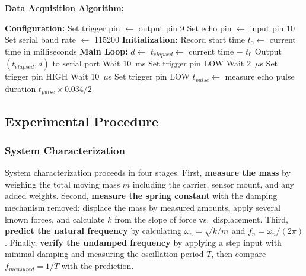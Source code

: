 \textbf{Data Acquisition Algorithm:}

\begin{algorithm}[H]
\caption{Second-Order System Distance Measurement}
\begin{algorithmic}[1]
\State \textbf{Configuration:}
\State \quad Set trigger pin $\leftarrow$ output pin 9
\State \quad Set echo pin $\leftarrow$ input pin 10
\State \quad Set serial baud rate $\leftarrow$ 115200
\State
\State \textbf{Initialization:}
\State Record start time $t_0 \leftarrow$ current time in milliseconds
\State
\State \textbf{Main Loop:}
    \State $d \leftarrow$ 
    \State $t_{elapsed} \leftarrow$ current time $-$ $t_0$
    \State Output $(t_{elapsed}, d)$ to serial port
    \State Wait 10~ms 
\EndWhile
\State
{}
    \State Set trigger pin LOW
    \State Wait 2~$\mu$s
    \State Set trigger pin HIGH
    \State Wait 10~$\mu$s
    \State Set trigger pin LOW
    \State $t_{pulse} \leftarrow$ measure echo pulse duration
    \State \Return $t_{pulse} \times 0.034 / 2$ 
\EndFunction
\end{algorithmic}
\end{algorithm}

\subsection{Experimental Procedure}

\subsubsection{System Characterization}

System characterization proceeds in four stages. First, \textbf{measure the mass} by weighing the total moving mass $m$ including the carrier, sensor mount, and any added weights. Second, \textbf{measure the spring constant} with the damping mechanism removed; displace the mass by measured amounts, apply several known forces, and calculate $k$ from the slope of force vs.\ displacement. Third, \textbf{predict the natural frequency} by calculating $\omega_n = \sqrt{k/m}$ and $f_n = \omega_n/(2\pi)$. Finally, \textbf{verify the undamped frequency} by applying a step input with minimal damping and measuring the oscillation period $T$, then compare $f_{measured} = 1/T$ with the prediction.

